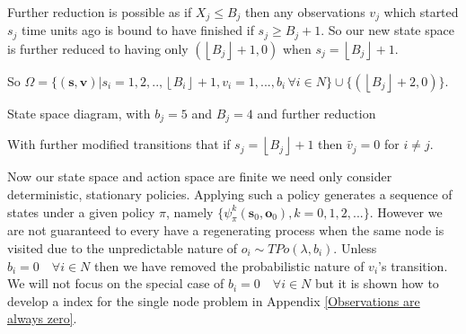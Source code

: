 \documentclass[a4paper,10pt]{article}
\newcommand{\floor}[1]{\left \lfloor #1 \right \rfloor}
\theoremstyle{definition}
\theoremstyle{definition}
\theoremstyle{remark}
\theoremstyle{definition}
\begin{document}
Further reduction is possible as if $X_{j} \leq B_{j}$ then any observations $v_{j}$ which started $s_{j}$ time units ago is bound to have finished if $s_{j} \geq B_{j}+1$. So our new state space is further reduced to having only $(\floor{B_{j}}+1,0)$ when $s_{j}=\floor{B_{j}}+1$.

So $\Omega= \{ (\bm{s},\bm{v}) | s_{i}=1,2,..,\floor{B_{i}}+1 , v_{i}=1,...,b_{i} \, \forall i \in N \} \cup \{(\floor{B_{j}}+2,0) \}$.

\begin{myfigure}
\begin{center}
\end{center}
\caption{State space diagram, with $b_{j}=5$ and $B_{j}=4$ and further reduction}
\end{myfigure}

With further modified transitions that if $s_{j}=\floor{B_{j}}+1$ then $\widetilde{v_{j}}=0$ for $i \neq j$. 

Now our state space and action space are finite we need only consider deterministic, stationary policies. Applying such a policy generates a sequence of states under a given policy $\pi$, namely $\{\psi_{\pi}^{k}(\bm{s}_{0},\bm{o}_{0}), k=0,1,2,... \}$. However we are not guaranteed to every have a regenerating process when the same node is visited due to the unpredictable nature of $o_{i} \sim TPo(\lambda,b_{i})$. Unless $b_{i}=0 \quad \forall i \in N$ then we have removed the probabilistic nature of $v_{i}$'s transition. We will not focus on the special case of $b_{i}=0 \quad \forall i \in N$ but it is shown how to develop a index for the single node problem in Appendix \ref{Observations are always zero}.
\end{document}
